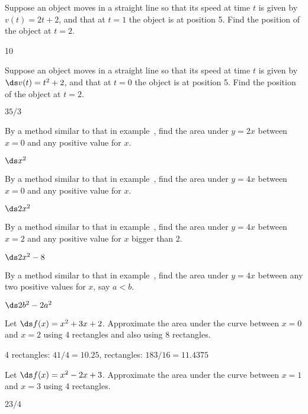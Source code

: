 \begin{exercises}

\exercise Suppose an object moves in a straight line so that its speed at
time $t$ is given by $v(t)=2t+2$, and that at $t=1$ the object is at
position 5. Find the position of the object at $t=2$.
\begin{answer} 10
\end{answer}

\exercise Suppose an object moves in a straight line so that its speed at
time $t$ is given by $\ds v(t)=t^2+2$, and that at $t=0$ the object is at
position 5. Find the position of the object at $t=2$.
\begin{answer} $35/3$
\end{answer}

\exercise By a method similar to that in example~, find the area under $y=2x$ between $x=0$ and any
  positive value for $x$.
\begin{answer} $\ds x^2$
\end{answer}

\exercise By a method similar to that in example~, find the area under $y=4x$ between $x=0$ and any
  positive value for $x$.
\begin{answer} $\ds 2x^2$
\end{answer}

\exercise By a method similar to that in example~, find the area under $y=4x$ between $x=2$ and any
  positive value for $x$ bigger than 2.
\begin{answer} $\ds 2x^2-8$
\end{answer}

\exercise By a method similar to that in example~, find the area under $y=4x$ between any two positive
  values for $x$, say $a<b$.
\begin{answer} $\ds 2b^2-2a^2$
\end{answer}

\exercise Let $\ds f(x)=x^2+3x+2$. Approximate the area under the curve
between $x=0$ and $x=2$ using 4 rectangles and also using 8
rectangles. 
\begin{answer} 4 rectangles: $41/4=10.25$,\hfill{} rectangles: $183/16= 11.4375$
\end{answer}

\exercise Let $\ds f(x)=x^2-2x+3$. Approximate the area under the curve
between $x=1$ and $x=3$ using 4 rectangles. 
\begin{answer} $ 23/4$
\end{answer}

\end{exercises}


